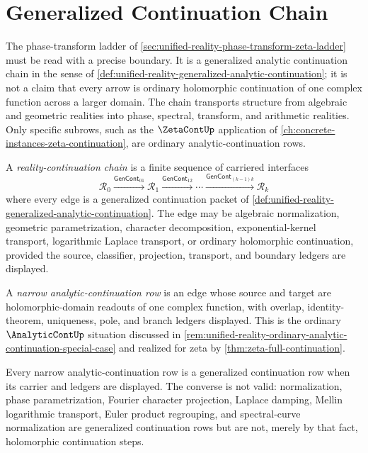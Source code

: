 \section{Generalized Continuation Chain}
\label{sec:unified-reality-generalized-continuation-chain}

The phase-transform ladder of
\autoref{sec:unified-reality-phase-transform-zeta-ladder} must be read
with a precise boundary. It is a generalized analytic continuation
chain in the sense of
\autoref{def:unified-reality-generalized-analytic-continuation}; it is
not a claim that every arrow is ordinary holomorphic continuation of one
complex function across a larger domain. The chain transports structure
from algebraic and geometric realities into phase, spectral, transform,
and arithmetic realities. Only specific subrows, such as the
$\ZetaContUp$ application of
\autoref{ch:concrete-instances-zeta-continuation}, are ordinary
analytic-continuation rows.

\begin{definition}
\label{def:unified-reality-reality-continuation-chain}
A \emph{reality-continuation chain} is a finite sequence of carriered
interfaces
$$
\mathcal R_0
\xrightarrow{\mathsf{GenCont}_{01}}
\mathcal R_1
\xrightarrow{\mathsf{GenCont}_{12}}
\cdots
\xrightarrow{\mathsf{GenCont}_{(k-1)k}}
\mathcal R_k
$$
where every edge is a generalized continuation packet of
\autoref{def:unified-reality-generalized-analytic-continuation}. The
edge may be algebraic normalization, geometric parametrization,
character decomposition, exponential-kernel transport, logarithmic
Laplace transport, or ordinary holomorphic continuation, provided the
source, classifier, projection, transport, and boundary ledgers are
displayed.
\end{definition}

\begin{definition}
\label{def:unified-reality-narrow-analytic-continuation-row}
A \emph{narrow analytic-continuation row} is an edge whose source and
target are holomorphic-domain readouts of one complex function, with
overlap, identity-theorem, uniqueness, pole, and branch ledgers
displayed. This is the ordinary $\AnalyticContUp$ situation discussed in
\autoref{rem:unified-reality-ordinary-analytic-continuation-special-case}
and realized for zeta by \autoref{thm:zeta-full-continuation}.
\end{definition}

\begin{principle}
\label{prin:unified-reality-generalized-continuation-wider-than-holomorphic}
Every narrow analytic-continuation row is a generalized continuation row
when its carrier and ledgers are displayed. The converse is not valid:
normalization, phase parametrization, Fourier character projection,
Laplace damping, Mellin logarithmic transport, Euler product regrouping,
and spectral-curve normalization are generalized continuation rows but
are not, merely by that fact, holomorphic continuation steps.
\end{principle}

